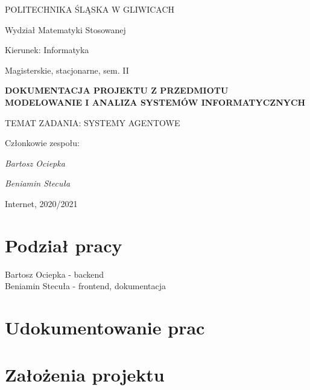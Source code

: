 \documentclass[12pt,a4paper]{article}
\begin{document}
\nocite{*}

\clearpage
\hspace{3cm}
\begin{center}POLITECHNIKA ŚLĄSKA W GLIWICACH\end{center}
\begin{center}Wydział Matematyki Stosowanej\end{center}
\begin{center}Kierunek: Informatyka\end{center}
\begin{center}Magisterskie, stacjonarne, sem. II\end{center}
\hspace{3cm}
\begin{center}\large\textbf{DOKUMENTACJA PROJEKTU Z PRZEDMIOTU\\MODELOWANIE I ANALIZA SYSTEMÓW INFORMATYCZNYCH}\end{center}
\hspace{10cm}
\begin{center}TEMAT ZADANIA: SYSTEMY AGENTOWE\end{center}
\hspace{5cm}
\begin{flushright}Członkowie zespołu:
\par
\textit{Bartosz Ociepka}
\par
\textit{Beniamin Stecuła}
\end{flushright}
\vfill
\begin{center}Internet, 2020/2021\end{center}

\newpage
\section{Podział pracy}

\begin{center}Bartosz Ociepka - backend\\Beniamin Stecuła - frontend, dokumentacja\end{center}

\section{Udokumentowanie prac}

\section{Założenia projektu}
\end{document}
